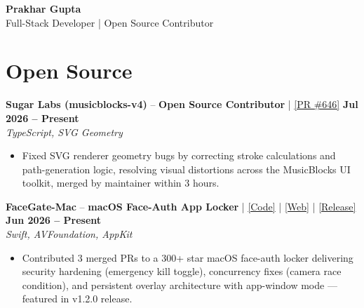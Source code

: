 \documentclass[a4paper,9pt]{extarticle}
\newenvironment{cvlist}{%
  \begin{itemize}[nosep, leftmargin=1.2em, itemsep=0.5pt, topsep=1pt, label=\textbullet, after=\vspace{2pt}]
}{%
  \end{itemize}
}
\begin{document}
\pagestyle{empty}

{\centering
{\LARGE\textbf{Prakhar Gupta}} \\[2pt]
{\normalsize Full-Stack Developer | Open Source Contributor} \\[2pt]
\par
}

\vspace{4pt}

\section{Open Source}
\noindent\textbf{Sugar Labs (musicblocks-v4)} -- \textbf{Open Source Contributor} | \href{https://github.com/sugarlabs/musicblocks-v4/pull/646}{\small [PR \#646]} \hfill \textbf{Jul 2026 -- Present}\\[1pt]
\noindent\textit{TypeScript, SVG Geometry}
\begin{cvlist}
  \item  Fixed SVG renderer geometry bugs by correcting stroke calculations and path-generation logic, resolving visual distortions across the MusicBlocks UI toolkit, merged by maintainer within 3 hours.\end{cvlist}

\noindent\textbf{FaceGate-Mac} -- \textbf{macOS Face-Auth App Locker} | \href{https://github.com/dweep-desai/FaceGate-Mac}{\small [Code]} | \href{https://dweep-desai.github.io/FaceGate-web/}{\small [Web]} | \href{https://github.com/dweep-desai/FaceGate-Mac/releases/tag/v1.2.0}{\small [Release]} \hfill \textbf{Jun 2026 -- Present}\\[1pt]
\noindent\textit{Swift, AVFoundation, AppKit}
\begin{cvlist}
  \item  Contributed 3 merged PRs to a 300+ star macOS face-auth locker delivering security hardening (emergency kill toggle), concurrency fixes (camera race condition), and persistent overlay architecture with app-window mode — featured in v1.2.0 release.\end{cvlist}
\end{document}

